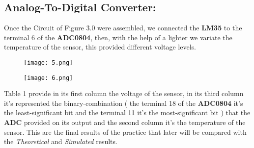 \subsection{Analog-To-Digital Converter:}

Once the Circuit of Figure 3.0 were assembled, we connected the {\bfseries LM35} to the terminal 6 of the {\bfseries ADC0804}, then, with the help of a lighter we variate the temperature of the sensor, this provided different voltage levels. \hfill \break

{\bfseries\itshape\color{carmine}{Observation:}} {\itshape{}} \hfill \break

\begin{figure}[H]
\texttt{[image: 5.png]}
\centering \linebreak {}
\end{figure}

\begin{figure}[H]
\texttt{[image: 6.png]}
\centering \linebreak {}
\end{figure} \hfill \break

\pagebreak

Table 1 provide in its first column the voltage of the sensor, in its third column it's represented the binary-combination ( the terminal 18 of the {\bfseries ADC0804} it's the least-significant bit and the terminal 11 it's the most-significant bit ) that the {\bfseries ADC} provided on its output and the second column it's the temperature of the sensor. This are the final results of the practice that later will be compared with the {\itshape Theoretical} and {\itshape Simulated} results. \hfill \break

